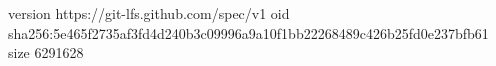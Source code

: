 version https://git-lfs.github.com/spec/v1
oid sha256:5e465f2735af3fd4d240b3c09996a9a10f1bb22268489c426b25fd0e237bfb61
size 6291628
